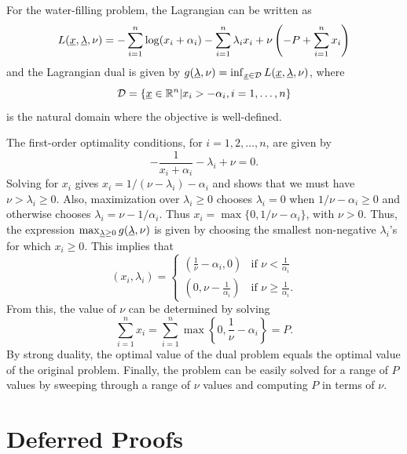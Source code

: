 \begin{example}
For the water-filling problem, the Lagrangian can be written as
\[ L(\underline{x},\underline{\lambda},\nu) = - \sum_{i=1}^n \log(x_i + \alpha_i) - \sum_{i=1}^n \lambda_i x_i + \nu \left( -P + \sum_{i=1}^n x_i \right)  \]
and the Lagrangian dual is given by $g(\underline{\lambda},\nu)
= \inf_{\underline{x}\in \mathcal{D}} L(\underline{x},\underline{\lambda},\nu)$, where \[\mathcal{D} = \{ \underline{x} \in \mathbb{R}^n | x_i > -\alpha_i, i=1,\ldots,n \}\] is the natural domain where the objective is well-defined.

The first-order optimality conditions, for $i=1,2,\ldots,n$, are given by
\[ -\frac{1}{x_i + \alpha_i} - \lambda_i + \nu = 0.
\]
Solving for $x_i$ gives 
$x_i=1/(\nu-\lambda_i)-\alpha_i$ and shows that we must have $\nu>\lambda_i\geq0$.
Also, maximization over $\lambda_i\geq0$ chooses $\lambda_i=0$ when $1/\nu-\alpha_i\geq0$ and otherwise chooses $\lambda_i=\nu-1/\alpha_i$.  Thus $x_i=\max\{0,1/\nu-\alpha_i\}$, with $\nu>0$.
Thus, the expression
$\max_{\underline{\lambda} \geq 0} g(\underline{\lambda},\nu)$
is given by choosing the smallest non-negative $\lambda_i$'s for which $x_i \geq 0$.
This implies that
\[ (x_i,\lambda_i) = \begin{cases} \left( \frac{1}{\nu} - \alpha _i, 0 \right) & \text{if }\nu < \frac{1}{\alpha_i} \\ \left(0,\nu-\frac{1}{\alpha_i}\right) & \text{if } \nu \geq \frac{1}{\alpha_i}. \end{cases} \]
From this, the value of $\nu$ can be determined by solving
\[\sum_{i=1}^n x_i = \sum_{i=1}^n \max \left\{ 0,\frac{1}{\nu}-\alpha_i \right\} = P. \]
By strong duality, the optimal value of the dual problem equals the optimal value of the original problem.
Finally, the problem can be easily solved for a range of $P$ values by sweeping through a range of $\nu$ values and computing $P$ in terms of $\nu$.
\end{example}

\section{Deferred Proofs}
\label{sec:opt_def_proof}

